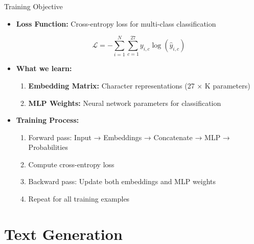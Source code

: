 \documentclass[usenames,dvipsnames]{beamer}
\begin{document}
\begin{frame}{Training Objective}
\begin{itemize}
\item \textbf{Loss Function:} Cross-entropy loss for multi-class classification

\begin{equation}
\mathcal{L} = -\sum_{i=1}^{N} \sum_{c=1}^{27} y_{i,c} \log(\hat{y}_{i,c})
\end{equation}

\pause
\item \textbf{What we learn:}
\begin{enumerate}
\pause
\item \textbf{Embedding Matrix:} Character representations (27 × K parameters)
\pause
\item \textbf{MLP Weights:} Neural network parameters for classification
\end{enumerate}

\pause
\item \textbf{Training Process:}
\begin{enumerate}
\pause
\item Forward pass: Input → Embeddings → Concatenate → MLP → Probabilities
\item Compute cross-entropy loss
\item Backward pass: Update both embeddings and MLP weights
\pause
\item Repeat for all training examples
\end{enumerate}
\end{itemize}
\end{frame}

\section{Text Generation}
\end{document}
